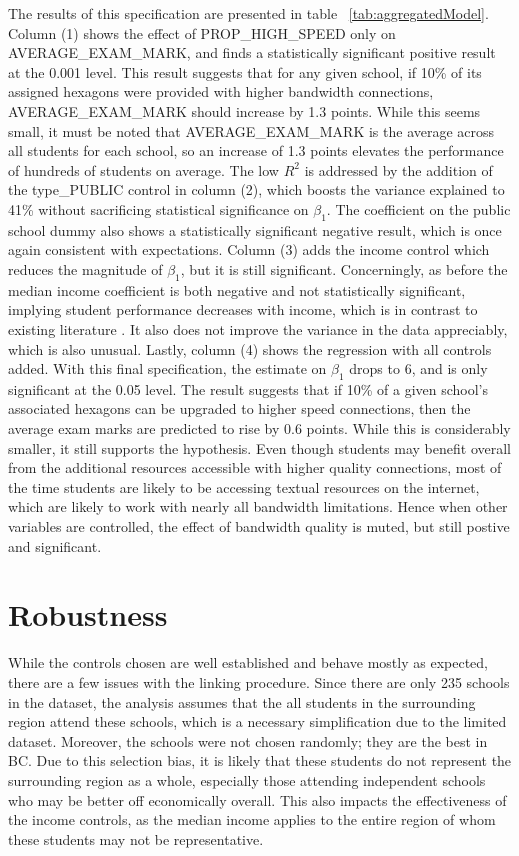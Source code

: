 \documentclass[stu, floatsintext]{apa7}
\begin{document}
    The results of this specification are presented in table ~\ref{tab:aggregatedModel}. Column (1) shows the effect of PROP\_HIGH\_SPEED only on AVERAGE\_EXAM\_MARK, and finds a statistically significant positive result at the 0.001 level. This result suggests that for any given school, if 10\% of its assigned hexagons were provided with higher bandwidth connections, AVERAGE\_EXAM\_MARK should increase by 1.3 points. While this seems small, it must be noted that AVERAGE\_EXAM\_MARK is the average across all students for each school, so an increase of 1.3 points elevates the performance of hundreds of students on average. The low $R^2$ is addressed by the addition of the type\_PUBLIC control in column (2), which boosts the variance explained to 41\% without sacrificing statistical significance on $\beta_1$. The coefficient on the public school dummy also shows a statistically significant negative result, which is once again consistent with expectations. Column (3) adds the income control which reduces the magnitude of $\beta_1$, but it is still significant. Concerningly, as before the median income coefficient is both negative and not statistically significant, implying student performance decreases with income, which is in contrast to existing literature \autocite{comfort2001}. It also does not improve the variance in the data appreciably, which is also unusual. Lastly, column (4) shows the regression with all controls added. With this final specification, the estimate on $\beta_1$ drops to 6, and is only significant at the 0.05 level. The result suggests that if 10\% of a given school's associated hexagons can be upgraded to higher speed connections, then the average exam marks are predicted to rise by 0.6 points. While this is considerably smaller, it still supports the hypothesis. Even though students may benefit overall from the additional resources accessible with higher quality connections, most of the time students are likely to be accessing textual resources on the internet, which are likely to work with nearly all bandwidth limitations. Hence when other variables are controlled, the effect of bandwidth quality is muted, but still postive and significant. 

    \section{Robustness}
    While the controls chosen are well established and behave mostly as expected, there are a few issues with the linking procedure. Since there are only 235 schools in the dataset, the analysis assumes that the all students in the surrounding region attend these schools, which is a necessary simplification due to the limited dataset. Moreover, the schools were not chosen randomly; they are the best in BC. Due to this selection bias, it is likely that these students do not represent the surrounding region as a whole, especially those attending independent schools who may be better off economically overall. This also impacts the effectiveness of the income controls, as the median income applies to the entire region of whom these students may not be representative. \\
    
\end{document}
